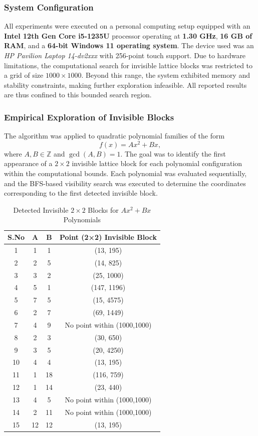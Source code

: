 \documentclass[12pt, reqno]{amsart}
\theoremstyle{definition}
\theoremstyle{remark}
\numberwithin{equation}{section}
\begin{document}
\subsubsection{System Configuration}
All experiments were executed on a personal computing setup equipped with an \textbf{Intel 12th Gen Core i5-1235U} processor operating at \textbf{1.30 GHz}, \textbf{16 GB of RAM}, and a \textbf{64-bit Windows 11 operating system}. The device used was an \textit{HP Pavilion Laptop 14-dv2xxx} with 256-point touch support.  
Due to hardware limitations, the computational search for invisible lattice blocks was restricted to a grid of size $1000 \times 1000$. Beyond this range, the system exhibited memory and stability constraints, making further exploration infeasible. All reported results are thus confined to this bounded search region.

\subsubsection{Empirical Exploration of Invisible Blocks}
The algorithm was applied to quadratic polynomial families of the form
\[
f(x) = A x^2 + Bx,
\]
where $A, B \in \mathbb{Z}$ and $\gcd(A,B) = 1$.  
The goal was to identify the first appearance of a $2\times2$ invisible lattice block for each polynomial configuration within the computational bounds.  
Each polynomial was evaluated sequentially, and the BFS-based visibility search was executed to determine the coordinates corresponding to the first detected invisible block.

\begin{table}[H]
\centering
\caption{Detected Invisible $2\times2$ Blocks for $A x^2 + Bx$ Polynomials}
\vspace{0.5cm}
\label{tab:blocks}
\begin{tabular}{|c|c|c|c|}
\hline
\textbf{S.No} & \textbf{A} & \textbf{B} & \textbf{Point (2×2) Invisible Block} \\ \hline
1  & 1  & 1  & (13, 195) \\ \hline
2  & 2  & 5  & (14, 825) \\ \hline
3  & 3  & 2  & (25, 1000) \\ \hline
4  & 5  & 1  & (147, 1196) \\ \hline
5  & 7  & 5  & (15, 4575) \\ \hline
6  & 2  & 7  & (69, 1449) \\ \hline
7  & 4  & 9  & No point within (1000,1000) \\ \hline
8  & 2  & 3  & (30, 650) \\ \hline
9  & 3  & 5  & (20, 4250) \\ \hline
10 & 4  & 4  & (13, 195) \\ \hline
11 & 1  & 18 & (116, 759) \\ \hline
12 & 1  & 14 & (23, 440) \\ \hline
13 & 4  & 5  & No point within (1000,1000) \\ \hline
14 & 2  & 11 & No point within (1000,1000) \\ \hline
15 & 12 & 12 & (13, 195) \\ \hline
\end{tabular}
\end{table}
\end{document}
